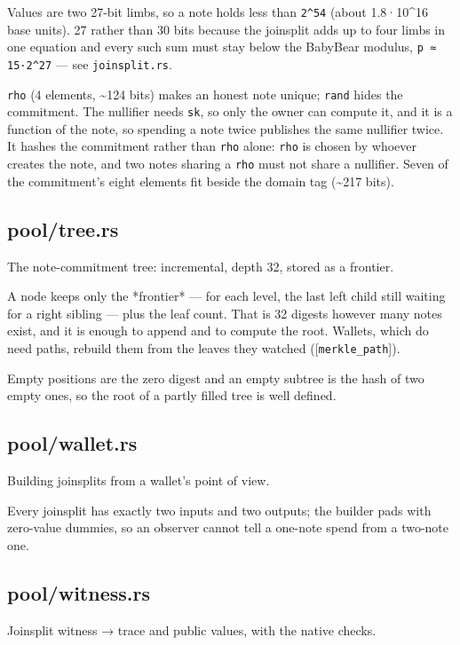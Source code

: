 \documentclass[11pt,a4paper]{article}
\begin{document}
Values are two 27-bit limbs, so a note holds less than \texttt{2\textasciicircum{}54} (about
1.8·10\textasciicircum{}16 base units). 27 rather than 30 bits because the joinsplit adds up
to four limbs in one equation and every such sum must stay below the
BabyBear modulus, \texttt{p ≈ 15·2\textasciicircum{}27} — see \texttt{joinsplit.rs}.

\texttt{rho} (4 elements, \textasciitilde{}124 bits) makes an honest note unique; \texttt{rand} hides the
commitment. The nullifier needs \texttt{sk}, so only the owner can compute it, and
it is a function of the note, so spending a note twice publishes the same
nullifier twice. It hashes the commitment rather than \texttt{rho} alone: \texttt{rho} is
chosen by whoever creates the note, and two notes sharing a \texttt{rho} must not
share a nullifier. Seven of the commitment's eight elements fit beside the
domain tag (\textasciitilde{}217 bits).

\subsection{pool/tree.rs}
The note-commitment tree: incremental, depth 32, stored as a frontier.

A node keeps only the *frontier* — for each level, the last left child
still waiting for a right sibling — plus the leaf count. That is 32
digests however many notes exist, and it is enough to append and to
compute the root. Wallets, which do need paths, rebuild them from the
leaves they watched ([\texttt{merkle\_path}]).

Empty positions are the zero digest and an empty subtree is the hash of
two empty ones, so the root of a partly filled tree is well defined.

\subsection{pool/wallet.rs}
Building joinsplits from a wallet's point of view.

Every joinsplit has exactly two inputs and two outputs; the builder pads
with zero-value dummies, so an observer cannot tell a one-note spend from
a two-note one.

\subsection{pool/witness.rs}
Joinsplit witness → trace and public values, with the native checks.
\end{document}
